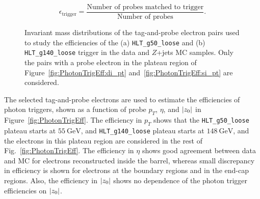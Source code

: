 \begin{equation}
	\label{eq:TrigEff}
    \epsilon_{\mathrm{trigger}} = \frac{\textrm{Number of probes matched to trigger}}{\textrm{Number of probes}}.
\end{equation}
%
\begin{figure}[!htb]
    \centering
    \caption{Invariant mass distributions of the tag-and-probe electron pairs used to study the efficiencies of the (a) \texttt{HLT\_g50\_loose} and (b) \texttt{HLT\_g140\_loose} trigger in the data and $Z$+jets MC samples. Only the pairs with a probe electron in the plateau region of Figure~\ref{fig:PhotonTrigEff:di_pt} and~\ref{fig:PhotonTrigEff:si_pt} are considered.
    }
    \label{fig:PhotonTrigMass}
\end{figure}

The selected tag-and-probe electrons are used to estimate the efficiencies of photon triggers, shown as a function of probe $p_{T}$, $\eta$, and $|z_{0}|$ in Figure~\ref{fig:PhotonTrigEff}. The efficiency in $p_{T}$ shows that the \texttt{HLT\_g50\_loose} plateau starts at $55~\si{\GeV}$, and \texttt{HLT\_g140\_loose} plateau starts at $148~\si{\GeV}$, and the electrons in this plateau region are considered in the rest of Fig.~\ref{fig:PhotonTrigEff}. The efficiency in $\eta$ shows good agreement between data and MC for electrons reconstructed inside the barrel, whereas small discrepancy in efficiency is shown for electrons at the boundary regions and in the end-cap regions. Also, the efficiency in $|z_{0}|$ shows no dependence of the photon trigger efficiencies on $|z_{0}|$.

